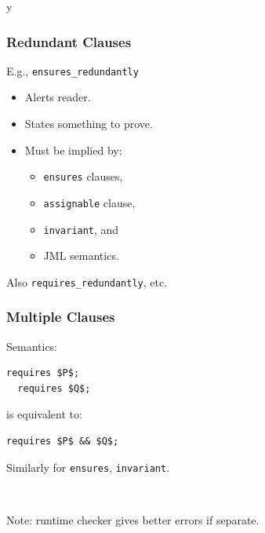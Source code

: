 \if y\MAKEHANDOUTS \documentclass[compress,landscape,handout]{beamer}
\begin{document}
\begin{frame}[fragile]
\frametitle{Redundant Clauses}

E.g., \lstinline!ensures_redundantly!
\begin{itemize}
\item
Alerts reader.

\item
States something to prove.

\item
Must be implied by:
\begin{itemize}
\item
\lstinline!ensures! clauses,

\item
\lstinline!assignable! clause,

\item
\lstinline!invariant!, and

\item
JML semantics.
\end{itemize}
\end{itemize}

Also \lstinline!requires_redundantly!, etc.
\end{frame}

\begin{frame}[fragile]
\frametitle{Multiple Clauses}

Semantics:

\begin{lstlisting}[mathescape=true]
  requires $P$;
  requires $Q$;
\end{lstlisting}

is equivalent to:

\begin{lstlisting}[mathescape=true]
  requires $P$ && $Q$;
\end{lstlisting}

Similarly for \lstinline!ensures!, \lstinline!invariant!.

~

Note: runtime checker gives better errors if separate.

\end{frame}
\end{document}
